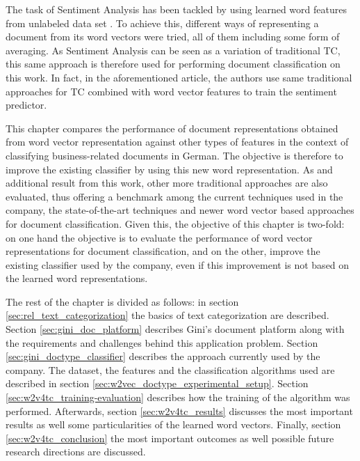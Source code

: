 The task of Sentiment Analysis  has been  tackled by using learned word
features from unlabeled data set \cite{maas2011learning}. To achieve this,
different ways of representing a document from its word vectors were tried,
all of them including some form of averaging. As Sentiment Analysis   can be
seen as a variation of traditional \ac{TC},  this same approach is therefore
used  for performing document classification on this work. In fact, in 
the aforementioned article,  the authors use same  traditional approaches for \ac{TC} combined with word vector features to train the sentiment predictor. 

This chapter compares the performance  of document representations obtained  from  word vector representation against other types of  features  in the context of classifying
business-related documents in German. The objective is therefore to
improve the existing classifier by  using this new word representation.
As and additional result from  this work,  other more traditional
approaches  are also evaluated, thus offering a benchmark among the current
techniques used in the company, the state-of-the-art techniques and 
newer word vector based approaches for document classification. Given this,
the objective of this chapter is two-fold:  on one hand the objective is to evaluate the
performance  of word vector representations for document classification,
and on the other, improve the existing classifier used by the company, even if this improvement is not based on the learned word representations.

The rest of the chapter is divided as follows: in section \ref{sec:rel_text_categorization} the basics of
text categorization are described. Section \ref{sec:gini_doc_platform}  describes 
Gini's  document platform along with  the requirements and challenges behind this
application problem. Section \ref{sec:gini_doctype_classifier} describes the
approach currently  used by the company.  The dataset, the features and  the classification algorithms used are
described in section \ref{sec:w2vec_doctype_experimental_setup}.  Section
\ref{sec:w2v4tc_training-evaluation} describes how the training of the
algorithm was performed. Afterwards, section \ref{sec:w2v4tc_results} discusses the most important results as
well some particularities of the learned word vectors.  Finally, section
\ref{sec:w2v4tc_conclusion} the most
important outcomes as well possible future
research directions are discussed. 
 
